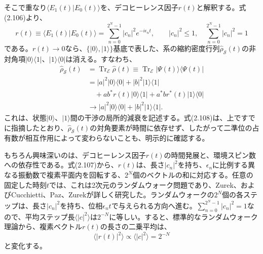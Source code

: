 そこで重なり$\langle E_1(t)\vert E_0(t)\rangle$を、デコヒーレンス因子$r(t)$と解釈する。式(2.106)より、
\begin{equation}r(t)\equiv\langle E_1(t)\vert E_0(t)\rangle=\sum_{n=0}^{2^N-1}\lvert c_n\rvert^2e^{-i\epsilon_n t},\qquad\lvert c_n\rvert^2\le1,\quad\sum_{n=0}^{2^N-1}\lvert c_n\rvert^2=1\tag{2.107}\end{equation}
である。$r(t)\longrightarrow0$なら、$\{\lvert0\rangle,\lvert1\rangle\}$基底で表した、系の縮約密度行列$\hat\rho_{\mathcal S}(t)$の非対角項$\lvert0\rangle\langle1\rvert$、$\lvert1\rangle\langle0\rvert$は消える。すなわち、
\begin{equation}\begin{split}\hat\rho_{\mathcal S}(t)&=\operatorname{Tr}_{\mathcal E}\hat\rho(t)\equiv\operatorname{Tr}_{\mathcal E}\lvert\Psi(t)\rangle\langle\Psi(t)\rvert\\&=\lvert a\rvert^2\lvert0\rangle\langle0\rvert+\lvert b\rvert^2\lvert1\rangle\langle1\rvert\\&\quad+ab^*r(t)\lvert0\rangle\langle1\rvert+a^*br^*(t)\lvert1\rangle\langle0\rvert\\&\longrightarrow\lvert a\rvert^2\lvert0\rangle\langle0\rvert+\lvert b\rvert^2\lvert1\rangle\langle1\rvert.\end{split}\tag{2.108}\end{equation}
これは、状態$\lvert0\rangle$、$\lvert1\rangle$間の干渉の局所的減衰を記述する。式(2.108)は、上ですでに指摘したとおり、$\hat\rho_{\mathcal S}(t)$の対角要素が時間に依存せず、したがって二準位の占有数が相互作用によって変わらないことも、明示的に確認する。

もちろん興味深いのは、デコヒーレンス因子$r(t)$の時間発展と、環境スピン数への依存性である。式(2.107)から、$r(t)$は、長さ$\lvert c_n\rvert^2$を持ち、$\epsilon_n$に比例する異なる振動数で複素平面内を回転する、$2^N$個のベクトルの和に対応する。任意の固定した時刻$t$では、これは2次元のランダムウォーク問題であり、Zurek\cite{ref009}、およびCucchietti、Paz、Zurek\cite{ref118}が詳しく研究した。ランダムウォークの$2^N$個の各ステップは、長さ$\lvert c_n\rvert^2$を持ち、位相$\epsilon_n t$で与えられる方向へ進む。$\sum_{n=0}^{2^N-1}\lvert c_n\rvert^2=1$なので、平均ステップ長$\langle\lvert c\rvert^2\rangle$は$2^{-N}$に等しい。すると、標準的なランダムウォーク理論から、複素ベクトル$r(t)$の長さの二乗平均は、
\begin{equation}\langle\lvert r(t)\rvert^2\rangle\propto\langle\lvert c\rvert^2\rangle=2^{-N}\tag{2.109}\end{equation}
と変化する。

